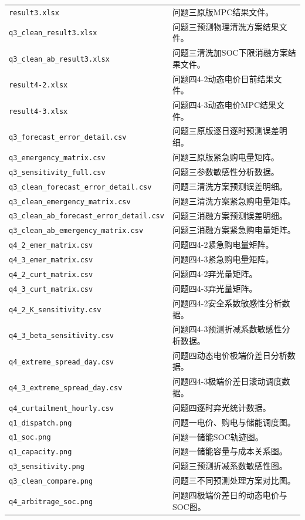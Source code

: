 \documentclass{cumcmthesis}
\begin{document}
\begin{longtable}{p{5.2cm}p{8.8cm}}
\texttt{result3.xlsx} & 问题三原版MPC结果文件。\\
\texttt{q3\_clean\_result3.xlsx} & 问题三预测物理清洗方案结果文件。\\
\texttt{q3\_clean\_ab\_result3.xlsx} & 问题三清洗加SOC下限消融方案结果文件。\\
\texttt{result4-2.xlsx} & 问题四4-2动态电价日前结果文件。\\
\texttt{result4-3.xlsx} & 问题四4-3动态电价MPC结果文件。\\
\texttt{q3\_forecast\_error\_detail.csv} & 问题三原版逐日逐时预测误差明细。\\
\texttt{q3\_emergency\_matrix.csv} & 问题三原版紧急购电量矩阵。\\
\texttt{q3\_sensitivity\_full.csv} & 问题三参数敏感性分析数据。\\
\texttt{q3\_clean\_forecast\_error\_detail.csv} & 问题三清洗方案预测误差明细。\\
\texttt{q3\_clean\_emergency\_matrix.csv} & 问题三清洗方案紧急购电量矩阵。\\
\texttt{q3\_clean\_ab\_forecast\_error\_detail.csv} & 问题三消融方案预测误差明细。\\
\texttt{q3\_clean\_ab\_emergency\_matrix.csv} & 问题三消融方案紧急购电量矩阵。\\
\texttt{q4\_2\_emer\_matrix.csv} & 问题四4-2紧急购电量矩阵。\\
\texttt{q4\_3\_emer\_matrix.csv} & 问题四4-3紧急购电量矩阵。\\
\texttt{q4\_2\_curt\_matrix.csv} & 问题四4-2弃光量矩阵。\\
\texttt{q4\_3\_curt\_matrix.csv} & 问题四4-3弃光量矩阵。\\
\texttt{q4\_2\_K\_sensitivity.csv} & 问题四4-2安全系数敏感性分析数据。\\
\texttt{q4\_3\_beta\_sensitivity.csv} & 问题四4-3预测折减系数敏感性分析数据。\\
\texttt{q4\_extreme\_spread\_day.csv} & 问题四动态电价极端价差日分析数据。\\
\texttt{q4\_3\_extreme\_spread\_day.csv} & 问题四4-3极端价差日滚动调度数据。\\
\texttt{q4\_curtailment\_hourly.csv} & 问题四逐时弃光统计数据。\\
\texttt{q1\_dispatch.png} & 问题一电价、购电与储能调度图。\\
\texttt{q1\_soc.png} & 问题一储能SOC轨迹图。\\
\texttt{q1\_capacity.png} & 问题一储能容量与成本关系图。\\
\texttt{q3\_sensitivity.png} & 问题三预测折减系数敏感性图。\\
\texttt{q3\_clean\_compare.png} & 问题三不同预测处理方案对比图。\\
\texttt{q4\_arbitrage\_soc.png} & 问题四极端价差日的动态电价与SOC图。\\
\end{longtable}
\end{document}
